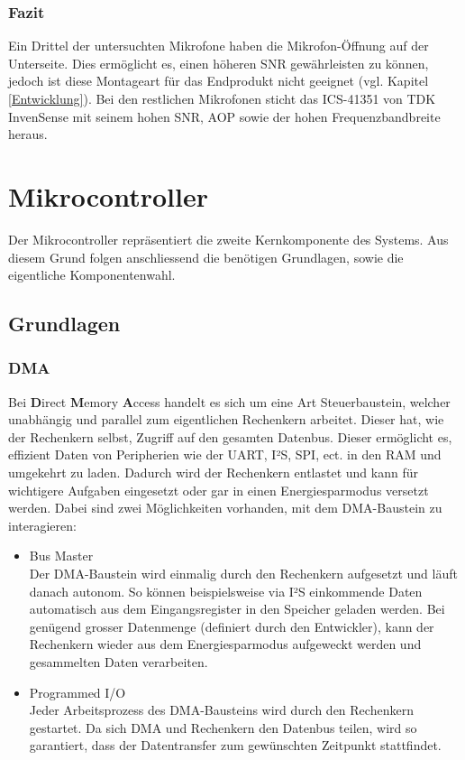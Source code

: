 \documentclass[12pt]{article}
\begin{document}
	\subsubsection{Fazit}
	Ein Drittel der untersuchten Mikrofone haben die Mikrofon-Öffnung auf der Unterseite. Dies ermöglicht es, einen höheren SNR gewährleisten zu können, jedoch ist diese Montageart für das Endprodukt nicht geeignet (vgl. Kapitel \ref{Entwicklung}). Bei den restlichen Mikrofonen sticht das ICS-41351 von TDK InvenSense mit seinem hohen SNR, AOP sowie der hohen Frequenzbandbreite heraus.
	
	\newpage
	\section{Mikrocontroller}\label{Mikrocontroller}
	Der Mikrocontroller repräsentiert die zweite Kernkomponente des Systems. Aus diesem Grund folgen anschliessend die benötigen Grundlagen, sowie die eigentliche Komponentenwahl.
	\subsection{Grundlagen}
	\subsubsection*{DMA}
	Bei \textbf{D}irect \textbf{M}emory \textbf{A}ccess handelt es sich um eine Art Steuerbaustein, welcher unabhängig und parallel zum eigentlichen Rechenkern arbeitet. Dieser hat, wie der Rechenkern selbst, Zugriff auf den gesamten Datenbus. Dieser ermöglicht es, effizient Daten von Peripherien wie der UART, I²S, SPI, ect. in den RAM und umgekehrt zu laden. Dadurch wird der Rechenkern entlastet und kann für wichtigere Aufgaben eingesetzt oder gar in einen Energiesparmodus versetzt werden. Dabei sind zwei Möglichkeiten vorhanden, mit dem DMA-Baustein zu interagieren:
	\begin{itemize}
		\item Bus Master \\
		Der DMA-Baustein wird einmalig durch den Rechenkern aufgesetzt und läuft danach autonom. So können beispielsweise via I²S einkommende Daten automatisch aus dem Eingangsregister in den Speicher geladen werden. Bei genügend grosser Datenmenge (definiert durch den Entwickler), kann der Rechenkern wieder aus dem Energiesparmodus aufgeweckt werden und gesammelten Daten verarbeiten.
		\item Programmed I/O \\
		Jeder Arbeitsprozess des DMA-Bausteins wird durch den Rechenkern gestartet. Da sich DMA und Rechenkern den Datenbus teilen, wird so garantiert, dass der Datentransfer zum gewünschten Zeitpunkt stattfindet.
	\end{itemize}
\end{document}
